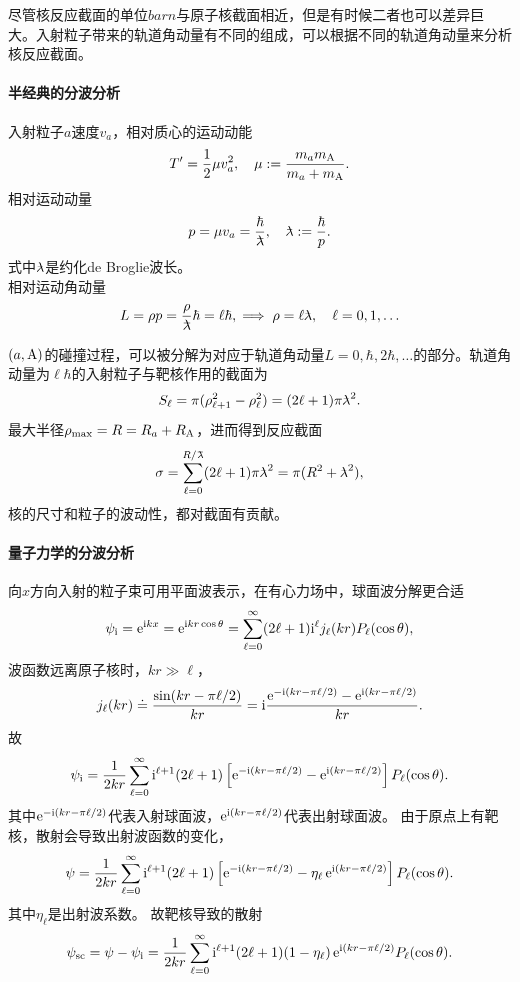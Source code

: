尽管核反应截面的单位$\si{barn}$与原子核截面相近，但是有时候二者也可以差异巨大。入射粒子带来的轨道角动量有不同的组成，可以根据不同的轨道角动量来分析核反应截面。

\paragraph{半经典的分波分析}入射粒子$a$速度$v_a$，相对质心的运动动能
\[
	T'=\frac12\mu v_a^2,\quad \mu:=\frac{m_am_{\mathrm{A}}}{m_a+m_{\mathrm{A}}}.
\]
相对运动动量
\[
	p=\mu v_a=\frac\hbar\barlambda,\quad\lambdabar:=\frac\hbar{p}.
\]
式中${^{_-}\!\!\!\!\lambda}$是约化de Broglie波长。\\
相对运动角动量
\[
	L=\rho p=\frac\rho\barlambda\hbar=\ell\hbar,\implies\rho=\ell\lambdabar,\quad\ell=0,1,\ldots
\]%

$(a,\mathrm{A})$的碰撞过程，可以被分解为对应于轨道角动量$L=0,\hbar,2\hbar,\ldots$的部分。轨道角动量为$\ell\hbar$的入射粒子与靶核作用的截面为
\[
	S_\ell=\pi(\rho_{\ell+1}^2-\rho_\ell^2)=(2\ell+1)\pi{^{_-}\!\!\!\!\lambda}^2.
\]
最大半径$\rho_\mathrm{max}=R=R_a+R_{\mathrm{A}}$，进而得到反应截面
\begin{align}
	\sigma=\sum_{\ell=0}^{R/\barlambda}(2\ell+1)\pi\lambdabar^2=\pi(R^2+\lambdabar^2),
\end{align}
核的尺寸和粒子的波动性，都对截面有贡献。
\paragraph{量子力学的分波分析}
向$x$方向入射的粒子束可用平面波表示，在有心力场中，球面波分解更合适
\[
	\psi_{\mathrm{i}}=\mathop{}\!\mathrm{e}^{\mathrm{i} kx}=\mathop{}\!\mathrm{e}^{\mathrm{i} kr\cos\theta}=\sum_{\ell=0}^\infty(2\ell+1)\mathrm{i}^\ell j_\ell(kr)P_\ell(\cos\theta),
\]
波函数远离原子核时，$kr\gg\ell$，
\[
	j_\ell(kr)\doteq\frac{\sin(kr-\pi\ell/2)}{kr}=\mathrm{i}\frac{\mathop{}\!\mathrm{e}^{-\mathrm{i}(kr-\pi\ell/2)}-\mathop{}\!\mathrm{e}^{\mathrm{i}(kr-\pi\ell/2)}}{kr}.
\]
故
\[
	\psi_{\mathrm{i}}=\frac1{2kr}\sum_{\ell=0}^\infty\mathrm{i}^{\ell+1}(2\ell+1)\left[\mathop{}\!\mathrm{e}^{-\mathrm{i}(kr-\pi\ell/2)}-\mathop{}\!\mathrm{e}^{\mathrm{i}(kr-\pi\ell/2)}\right]P_\ell(\cos\theta).
\]
其中$\mathop{}\!\mathrm{e}^{-\mathrm{i}(kr-\pi\ell/2)}$代表入射球面波，$\mathop{}\!\mathrm{e}^{\mathrm{i}(kr-\pi\ell/2)}$代表出射球面波。
由于原点上有靶核，散射会导致出射波函数的变化，
\[
	\psi=\frac1{2kr}\sum_{\ell=0}^\infty\mathrm{i}^{\ell+1}(2\ell+1)\left[\mathop{}\!\mathrm{e}^{-\mathrm{i}(kr-\pi\ell/2)}-\eta_\ell\mathop{}\!\mathrm{e}^{\mathrm{i}(kr-\pi\ell/2)}\right]P_\ell(\cos\theta).
\]
其中$\eta_\ell$是出射波系数。
故靶核导致的散射
\begin{align}
	\psi_{\mathrm{sc}}=\psi-\psi_{\mathrm{i}}=\frac1{2kr}\sum_{\ell=0}^\infty\mathrm{i}^{\ell+1}(2\ell+1)(1-\eta_\ell)\mathop{}\!\mathrm{e}^{\mathrm{i}(kr-\pi\ell/2)}P_\ell(\cos\theta).
\end{align}

